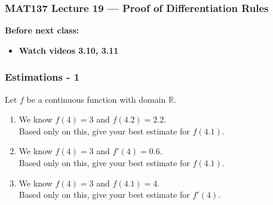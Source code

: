 \documentclass[14pt]{beamer}
\newcommand {\R}{\mathbb{R}}
\begin{document}
\begin{frame}
	\frametitle{MAT137 Lecture 19 --- Proof of Differentiation Rules}

	\vfill
	{\bf Before next class:}
		\begin{itemize} \normalsize
			\item {\bf Watch videos 3.10, 3.11 }
		\end{itemize}
\end{frame}

\begin{frame}
\frametitle{Estimations - 1}

Let $f$ be a continuous function with domain $\R$.

\vfill

\begin{enumerate}
	\item  We know $f(4)=3$ and $f(4.2)=2.2$.  \\
		Based only on this, give your best estimate for $f(4.1)$.
\vfill

	\item  We know $f(4)=3$ and $f'(4)=0.6$. \\
		Based only on this, give your best estimate for $f(4.1)$.
\vfill
		
	\item  We know $f(4)=3$ and $f(4.1) = 4$. \\
		Based only on this, give your best estimate for $f'(4)$.	
\end{enumerate}

\vfill

\end{frame}
\end{document}
